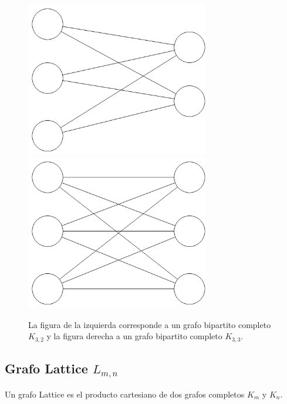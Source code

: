 \begin{figure}[H]
\includegraphics[width=80mm]{K3_2.png}
\includegraphics[width=80mm]{K3_3.png}
\caption{La figura de la izquierda corresponde a un grafo bipartito completo $K_{3,2}$ y la figura derecha a un grafo bipartito completo $K_{3,3}$.}
\label{overflow}
\end{figure}


\subsection{Grafo Lattice $L_{m,n}$}
Un grafo Lattice es el producto cartesiano de dos grafos completos $K_m$ y $K_n$.

